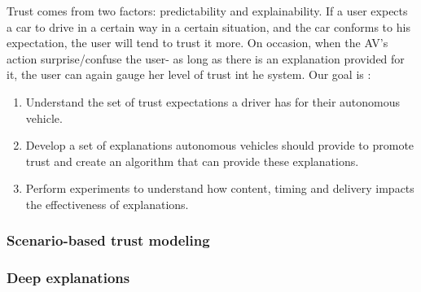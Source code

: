 Trust comes from two factors: predictability and explainability.
If a user expects a car to drive in a certain way in a certain situation, and the car conforms to his expectation, the user will tend to trust it more.
On occasion, when the AV’s action surprise/confuse the user- as long as there is an explanation provided for it, the user can again gauge her level of trust int he system.
Our goal is :
\begin{enumerate}[itemsep=0pt,parsep=0pt,topsep=4pt,leftmargin=0.4in]
    \item Understand the set of trust expectations a driver has for their autonomous vehicle.
    \item Develop a set of explanations autonomous vehicles should provide to promote trust and create an algorithm that can provide these explanations.
    \item Perform experiments to understand how content, timing and delivery impacts the effectiveness of explanations.
\end{enumerate}

\subsubsection{Scenario-based trust modeling}
\label{subsec:trust-modeling}



\subsubsection{Deep explanations}
\label{subsec:explainability}
